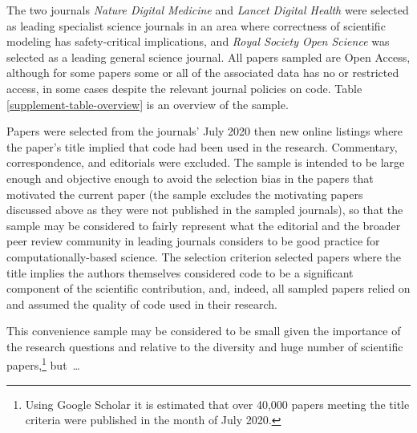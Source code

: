 \documentclass[10pt,a4paper]{article}
\begin{document}
The two journals \emph{Nature Digital Medicine\/} and \emph{Lancet Digital Health\/} were selected as leading specialist science journals in an area where correctness of scientific modeling has safety-critical implications, and \emph{Royal Society Open Science\/} was selected as a leading general science journal. All papers sampled are Open Access, although for some papers some or all of the associated data has no or restricted access, in some cases despite the relevant journal policies on code. Table \ref{supplement-table-overview} is an overview of the sample.  

Papers were selected from the journals' July 2020 then new online listings where the paper's title implied that code had been used in the research. Commentary, correspondence, and editorials were excluded. The sample is intended to be large enough and objective enough to avoid the selection bias in the papers that motivated the current paper (the sample excludes the motivating papers discussed above as they were not published in the sampled journals), so that the sample may be considered to fairly represent what the editorial and the broader peer review community in leading journals considers to be good practice for computationally-based science. The selection criterion selected papers where the title implies the authors themselves considered code to be a significant component of the scientific contribution, and, indeed, all sampled papers relied on and assumed the quality of code used in their research. 


This convenience sample may be considered to be small given the importance of the research questions and relative to the diversity and huge number of scientific papers,\footnote{Using Google Scholar it is estimated that over 40,000 papers meeting the title criteria were published in the month of July 2020.} but~\ldots
\end{document}
